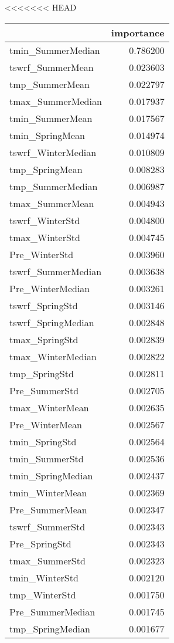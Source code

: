 <<<<<<< HEAD
\begin{tabular}{lr}
\toprule
 & importance \\
\midrule
tmin_SummerMedian & 0.786200 \\
tswrf_SummerMean & 0.023603 \\
tmp_SummerMean & 0.022797 \\
tmax_SummerMedian & 0.017937 \\
tmin_SummerMean & 0.017567 \\
tmin_SpringMean & 0.014974 \\
tswrf_WinterMedian & 0.010809 \\
tmp_SpringMean & 0.008283 \\
tmp_SummerMedian & 0.006987 \\
tmax_SummerMean & 0.004943 \\
tswrf_WinterStd & 0.004800 \\
tmax_WinterStd & 0.004745 \\
Pre_WinterStd & 0.003960 \\
tswrf_SummerMedian & 0.003638 \\
Pre_WinterMedian & 0.003261 \\
tswrf_SpringStd & 0.003146 \\
tswrf_SpringMedian & 0.002848 \\
tmax_SpringStd & 0.002839 \\
tmax_WinterMedian & 0.002822 \\
tmp_SpringStd & 0.002811 \\
Pre_SummerStd & 0.002705 \\
tmax_WinterMean & 0.002635 \\
Pre_WinterMean & 0.002567 \\
tmin_SpringStd & 0.002564 \\
tmin_SummerStd & 0.002536 \\
tmin_SpringMedian & 0.002437 \\
tmin_WinterMean & 0.002369 \\
Pre_SummerMean & 0.002347 \\
tswrf_SummerStd & 0.002343 \\
Pre_SpringStd & 0.002343 \\
tmax_SummerStd & 0.002323 \\
tmin_WinterStd & 0.002120 \\
tmp_WinterStd & 0.001750 \\
Pre_SummerMedian & 0.001745 \\
tmp_SpringMedian & 0.001677 \\

\end{tabular}
